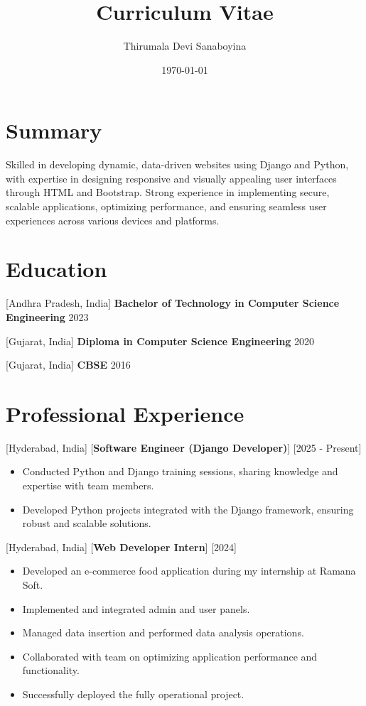 \documentclass[12pt, a4paper, margin=0.8in]{article}
\title{Curriculum Vitae}
\author{Thirumala Devi Sanaboyina}
\date{\today}
\begin{document}
\makecvtitle


\section*{Summary}
Skilled in developing dynamic, data-driven websites using Django and Python, with expertise in designing responsive and visually appealing user interfaces through HTML and Bootstrap. Strong experience in implementing secure, scalable applications, optimizing performance, and ensuring seamless user experiences across various devices and platforms.

\section{Education}

[Andhra Pradesh, India]
{\textbf{Bachelor of Technology in Computer Science Engineering} \hfill 2023}

[Gujarat, India]
{\textbf{Diploma in Computer Science Engineering} \hfill 2020}

[Gujarat, India]
{\textbf{CBSE} \hfill 2016}

\section{Professional Experience}

[Hyderabad, India] [\textbf{Software Engineer (Django Developer)}] [2025 - Present]
\begin{itemize}
    \item Conducted Python and Django training sessions, sharing knowledge and expertise with team members.
    \item Developed Python projects integrated with the Django framework, ensuring robust and scalable solutions.
\end{itemize}

[Hyderabad, India] [\textbf{Web Developer Intern}] [2024]
\begin{itemize}
    \item Developed an e-commerce food application during my internship at Ramana Soft.
    \item Implemented and integrated admin and user panels.
    \item Managed data insertion and performed data analysis operations.
    \item Collaborated with team on optimizing application performance and functionality.
    \item Successfully deployed the fully operational project.
\end{itemize}
\end{document}
